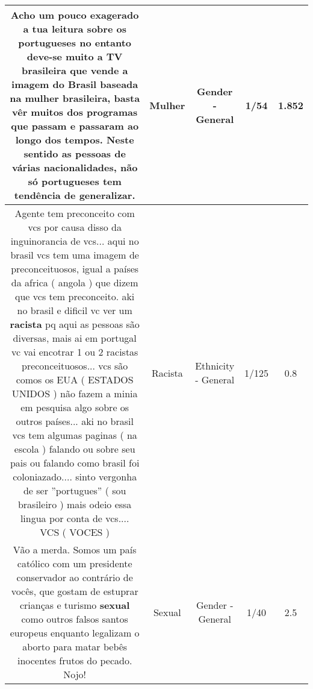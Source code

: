 \documentclass[11pt]{article}
\newlength\mylength
\begin{document}
\begin{center}
\begin{longtable}{|C{.65\mylength}|C{.30\mylength}|C{.12\mylength}|C{.12\mylength}|C{.12\mylength}|}
  \small Acho um pouco exagerado a tua leitura sobre os portugueses no entanto deve-se muito a TV brasileira que vende a imagem do Brasil baseada na \textbf{mulher} brasileira, basta vêr muitos dos programas que passam e passaram ao longo dos tempos. Neste sentido as pessoas de várias nacionalidades, não só portugueses tem tendência de generalizar.\normalsize   & Mulher & Gender - General & 1/54 & 1.852 \\  \hline
  \small Agente tem preconceito com vcs por causa disso da inguinorancia de vcs... aqui no brasil vcs tem uma imagem de preconceituosos, igual a países da africa ( angola ) que dizem que vcs tem preconceito. aki no brasil e dificil vc ver um \textbf{racista} pq aqui as pessoas são diversas, mais ai em portugal vc vai encotrar 1 ou 2 racistas preconceituosos... vcs são comos os EUA ( ESTADOS UNIDOS ) não fazem a minia em pesquisa algo sobre os outros países... aki no brasil vcs tem algumas paginas ( na escola ) falando ou sobre seu pais ou falando como brasil foi coloniazado.... sinto vergonha de ser ''portugues'' ( sou brasileiro ) mais odeio essa lingua por conta de vcs.... VCS ( VOCES )\normalsize   & Racista & Ethnicity - General & 1/125 & 0.8 \\  \hline
  \small Vão a merda. Somos um país católico com um presidente conservador ao contrário de vocês, que gostam de estuprar crianças e turismo \textbf{sexual} como outros falsos santos europeus enquanto legalizam o aborto para matar bebês inocentes frutos do pecado. Nojo!\normalsize   & Sexual & Gender - General & 1/40 & 2.5 \\  \hline

\end{longtable}
\end{center}
\end{document}
